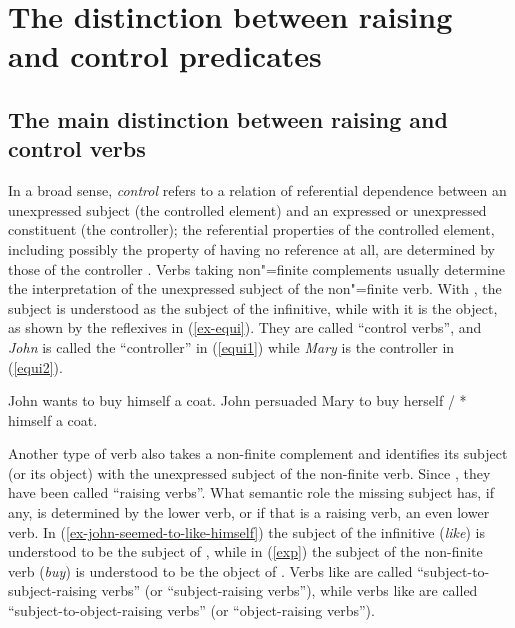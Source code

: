 
\section{The distinction between raising and control predicates}
\label{sec-distinction-raising-control}

\subsection{The main distinction between raising and control verbs}

In a broad sense, \emph{control} refers to a relation of referential dependence between an unexpressed
subject (the controlled element) and an expressed or unexpressed constituent (the controller); the
referential properties of the controlled element, including possibly the property of having no
reference at all,
are determined by those of the controller \citep[372]{Bresnan1982}. Verbs taking
non"=finite complements usually determine the interpretation of the unexpressed subject of the
non"=finite verb. With , the subject is understood as the subject of the infinitive,
while with  it is the object, as shown by the reflexives in (\ref{ex-equi}). They are
called ``control verbs'', and \emph{John} is called the ``controller'' in (\ref{equi1}) while
\emph{Mary} is the controller in (\ref{equi2}).  

\eal
\label{ex-equi}
\ex John wants to buy himself a coat. \label{equi1}
\ex John persuaded Mary to buy herself / * himself a coat.\label{equi2}
\zl

Another type of verb also takes a non-finite complement and identifies its subject (or its object)
with the unexpressed subject of the non-finite verb. Since \citet{Postal1974}, they have been called
``raising verbs''. What semantic role the missing subject has, if any, is determined by the lower
verb, or if that is a raising verb, an even lower verb. In (\ref{ex-john-seemed-to-like-himself}) the subject of the
infinitive (\emph{like}) is understood to be the subject of , while in (\ref{exp})
the subject of the non-finite verb (\emph{buy}) is understood to be the object of
. Verbs like  are called ``subject-to-subject-raising verbs'' (or
``subject-raising verbs''), while verbs like  are called ``subject-to-object-raising
verbs'' (or ``object-raising verbs''). 

